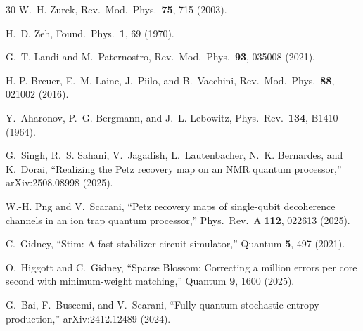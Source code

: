 \documentclass[prl,twocolumn,superscriptaddress,longbibliography]{revtex4-2}
\begin{document}
\begin{thebibliography}{30}
W.~H. Zurek,
Rev.\ Mod.\ Phys.\ \textbf{75}, 715 (2003).

H.~D. Zeh,
Found.\ Phys.\ \textbf{1}, 69 (1970).

G.~T. Landi and M.~Paternostro,
Rev.\ Mod.\ Phys.\ \textbf{93}, 035008 (2021).

H.-P. Breuer, E.~M. Laine, J.~Piilo, and B.~Vacchini,
Rev.\ Mod.\ Phys.\ \textbf{88}, 021002 (2016).

Y.~Aharonov, P.~G. Bergmann, and J.~L. Lebowitz,
Phys.\ Rev.\ \textbf{134}, B1410 (1964).

G.~Singh, R.~S. Sahani, V.~Jagadish, L.~Lautenbacher,
N.~K. Bernardes, and K.~Dorai,
``Realizing the Petz recovery map on an NMR quantum processor,''
arXiv:2508.08998 (2025).

W.-H. Png and V.~Scarani,
``Petz recovery maps of single-qubit decoherence channels in an
ion trap quantum processor,''
Phys.\ Rev.\ A \textbf{112}, 022613 (2025).

C.~Gidney,
``Stim: A fast stabilizer circuit simulator,''
Quantum \textbf{5}, 497 (2021).

O.~Higgott and C.~Gidney,
``Sparse Blossom: Correcting a million errors per core second with
minimum-weight matching,''
Quantum \textbf{9}, 1600 (2025).

G.~Bai, F.~Buscemi, and V.~Scarani,
``Fully quantum stochastic entropy production,''
arXiv:2412.12489 (2024).

\end{thebibliography}
\end{document}
